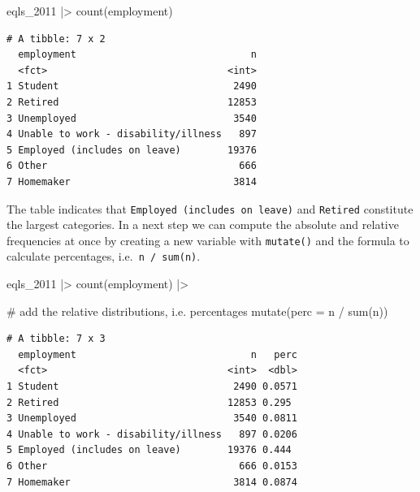 \documentclass[
  letterpaper,
]{krantz}
\makeatletter
\newenvironment{Shaded}{\begin{snugshade}}{\end{snugshade}}
\newcommand{\AttributeTok}[1]{\textcolor[rgb]{0.40,0.45,0.13}{#1}}
\newcommand{\CommentTok}[1]{\textcolor[rgb]{0.37,0.37,0.37}{#1}}
\newcommand{\FunctionTok}[1]{\textcolor[rgb]{0.28,0.35,0.67}{#1}}
\newcommand{\NormalTok}[1]{\textcolor[rgb]{0.00,0.23,0.31}{#1}}
\newcommand{\SpecialCharTok}[1]{\textcolor[rgb]{0.37,0.37,0.37}{#1}}
\newenvironment{kframe}{%
\medskip{}
\setlength{\fboxsep}{.8em}
 \def\at@end@of@kframe{}%
 \ifinner\ifhmode%
  \def\at@end@of@kframe{\end{minipage}}%
  \begin{minipage}{\columnwidth}%
 \fi\fi%
 \def\FrameCommand##1{\hskip\@totalleftmargin \hskip-\fboxsep
 \colorbox{shadecolor}{##1}\hskip-\fboxsep
     \hskip-\linewidth \hskip-\@totalleftmargin \hskip\columnwidth}%
 \MakeFramed {\advance\hsize-\width
   \@totalleftmargin\z@ \linewidth\hsize
   \@setminipage}}%
 {\par\unskip\endMakeFramed%
 \at@end@of@kframe}
\renewenvironment{Shaded}{\begin{kframe}}{\end{kframe}}
\makeatother
\begin{document}
\begin{Shaded}
\begin{Highlighting}[]
\NormalTok{eqls\_2011 }\SpecialCharTok{|\textgreater{}} \FunctionTok{count}\NormalTok{(employment)}
\end{Highlighting}
\end{Shaded}

\begin{verbatim}
# A tibble: 7 x 2
  employment                              n
  <fct>                               <int>
1 Student                              2490
2 Retired                             12853
3 Unemployed                           3540
4 Unable to work - disability/illness   897
5 Employed (includes on leave)        19376
6 Other                                 666
7 Homemaker                            3814
\end{verbatim}

The table indicates that \texttt{Employed\ (includes\ on\ leave)} and
\texttt{Retired} constitute the largest categories. In a next step we
can compute the absolute and relative frequencies at once by creating a
new variable with \texttt{mutate()} and the formula to calculate
percentages, i.e.~\texttt{n\ /\ sum(n)}.

\begin{Shaded}
\begin{Highlighting}[]
\NormalTok{eqls\_2011 }\SpecialCharTok{|\textgreater{}}
  \FunctionTok{count}\NormalTok{(employment) }\SpecialCharTok{|\textgreater{}}
  
  \CommentTok{\# add the relative distributions, i.e. percentages}
  \FunctionTok{mutate}\NormalTok{(}\AttributeTok{perc =}\NormalTok{ n }\SpecialCharTok{/} \FunctionTok{sum}\NormalTok{(n))}
\end{Highlighting}
\end{Shaded}

\begin{verbatim}
# A tibble: 7 x 3
  employment                              n   perc
  <fct>                               <int>  <dbl>
1 Student                              2490 0.0571
2 Retired                             12853 0.295 
3 Unemployed                           3540 0.0811
4 Unable to work - disability/illness   897 0.0206
5 Employed (includes on leave)        19376 0.444 
6 Other                                 666 0.0153
7 Homemaker                            3814 0.0874
\end{verbatim}
\end{document}
